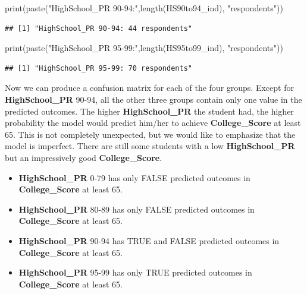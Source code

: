 \documentclass[
]{article}
\newenvironment{Shaded}{\begin{snugshade}}{\end{snugshade}}
\newcommand{\FunctionTok}[1]{\textcolor[rgb]{0.00,0.00,0.00}{#1}}
\newcommand{\NormalTok}[1]{#1}
\newcommand{\StringTok}[1]{\textcolor[rgb]{0.31,0.60,0.02}{#1}}
\providecommand{\tightlist}{%
  \setlength{\itemsep}{0pt}\setlength{\parskip}{0pt}}
\begin{document}
\begin{Shaded}
\begin{Highlighting}[]
\FunctionTok{print}\NormalTok{(}\FunctionTok{paste}\NormalTok{(}\StringTok{"HighSchool\_PR 90{-}94:"}\NormalTok{,}\FunctionTok{length}\NormalTok{(HS90to94\_ind), }\StringTok{"respondents"}\NormalTok{))}
\end{Highlighting}
\end{Shaded}

\begin{verbatim}
## [1] "HighSchool_PR 90-94: 44 respondents"
\end{verbatim}

\begin{Shaded}
\begin{Highlighting}[]
\FunctionTok{print}\NormalTok{(}\FunctionTok{paste}\NormalTok{(}\StringTok{"HighSchool\_PR 95{-}99:"}\NormalTok{,}\FunctionTok{length}\NormalTok{(HS95to99\_ind), }\StringTok{"respondents"}\NormalTok{))}
\end{Highlighting}
\end{Shaded}

\begin{verbatim}
## [1] "HighSchool_PR 95-99: 70 respondents"
\end{verbatim}

Now we can produce a confusion matrix for each of the four groups.
Except for \textbf{HighSchool\_PR} 90-94, all the other three groups
contain only one value in the predicted outcomes. The higher
\textbf{HighSchool\_PR} the student had, the higher probability the
model would predict him/her to achieve \textbf{College\_Score} at least
65. This is not completely unexpected, but we would like to emphasize
that the model is imperfect. There are still some students with a low
\textbf{HighSchool\_PR} but an impressively good
\textbf{College\_Score}.

\begin{itemize}
\tightlist
\item
  \textbf{HighSchool\_PR} 0-79 has only FALSE predicted outcomes in
  \textbf{College\_Score} at least 65.
\item
  \textbf{HighSchool\_PR} 80-89 has only FALSE predicted outcomes in
  \textbf{College\_Score} at least 65.
\item
  \textbf{HighSchool\_PR} 90-94 has TRUE and FALSE predicted outcomes in
  \textbf{College\_Score} at least 65.
\item
  \textbf{HighSchool\_PR} 95-99 has only TRUE predicted outcomes in
  \textbf{College\_Score} at least 65.
\end{itemize}
\end{document}
